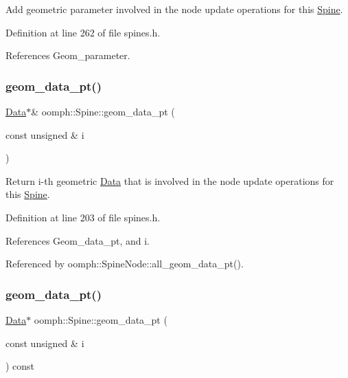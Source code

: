 Add geometric parameter involved in the node update operations for this \hyperlink{classoomph_1_1Spine}{Spine}. 



Definition at line 262 of file spines.\+h.



References Geom\+\_\+parameter.

\mbox{\label{classoomph_1_1Spine_aaf0954f69bd9bed913e714fafaad4644}} 
\subsubsection{\texorpdfstring{geom\+\_\+data\+\_\+pt()}{geom\_data\_pt()}\hspace{0.1cm}{\footnotesize\ttfamily [1/2]}}
{\footnotesize\ttfamily \hyperlink{classoomph_1_1Data}{Data}$\ast$\& oomph\+::\+Spine\+::geom\+\_\+data\+\_\+pt (\begin{DoxyParamCaption}\item[{const unsigned \&}]{i }\end{DoxyParamCaption})\hspace{0.3cm}{\ttfamily [inline]}}



Return i-\/th geometric \hyperlink{classoomph_1_1Data}{Data} that is involved in the node update operations for this \hyperlink{classoomph_1_1Spine}{Spine}. 



Definition at line 203 of file spines.\+h.



References Geom\+\_\+data\+\_\+pt, and i.



Referenced by oomph\+::\+Spine\+Node\+::all\+\_\+geom\+\_\+data\+\_\+pt().

\mbox{\label{classoomph_1_1Spine_a8d25c84698e695a1306b800539e25e90}} 
\subsubsection{\texorpdfstring{geom\+\_\+data\+\_\+pt()}{geom\_data\_pt()}\hspace{0.1cm}{\footnotesize\ttfamily [2/2]}}
{\footnotesize\ttfamily \hyperlink{classoomph_1_1Data}{Data}$\ast$ oomph\+::\+Spine\+::geom\+\_\+data\+\_\+pt (\begin{DoxyParamCaption}\item[{const unsigned \&}]{i }\end{DoxyParamCaption}) const\hspace{0.3cm}{\ttfamily [inline]}}



